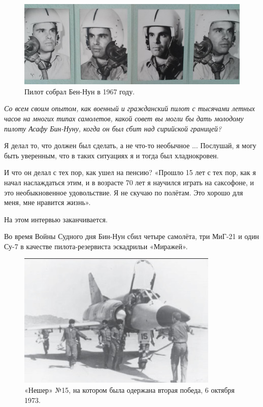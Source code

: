 \begin{figure}[h!tb] 
	\centering\includegraphics[scale=0.4]{History_BenNun/5o7jnb-c_8Y.jpg}
	\caption{Пилот собрал Бен-Нун в 1967 году.  }%
\end{figure}


\textit{ Со всем своим опытом, как военный и гражданский пилот с тысячами летных часов на многих типах самолетов, какой совет вы могли бы дать молодому пилоту Асафу Бин-Нуну, когда он был сбит над сирийской границей?}

Я делал то, что должен был сделать, а не что-то необычное ... Послушай, я могу быть уверенным, что в таких ситуациях я и тогда был хладнокровен.

И что он делал с тех пор, как ушел на пенсию? «Прошло 15 лет с тех пор, как я начал наслаждаться этим, и в возрасте 70 лет я научился играть на саксофоне, и это необыкновенное удовольствие. Я не скучаю по полётам. Это хорошо для меня, мне нравится жизнь».

На этом интервью заканчивается. 

Во время Войны Судного дня Бин-Нун сбил четыре самолёта, три МиГ-21 и один Су-7 в качестве пилота-резервиста эскадрильи «Миражей».

\begin{figure}[h!tb] 
	\centering\includegraphics[scale=0.8]{History_BenNun/ypM9yR7fsDQ.jpg}
	\caption{«Нешер» №15, на котором была одержана вторая победа, 6 октября 1973. }%
\end{figure}

